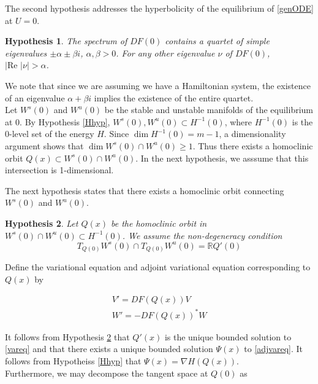 \documentclass[12pt]{article}
\def\R{{\mathbb R}}
\DeclareMathOperator{\dm}{dim}
\newtheorem{hypothesis}{Hypothesis}
\begin{document}
The second hypothesis addresses the hyperbolicity of the equilibrium of \eqref{genODE} at $U = 0$.  

\begin{hypothesis}\label{hypeq}
The spectrum of $DF(0)$ contains a quartet of simple eigenvalues $\pm \alpha \pm \beta i$, $\alpha, \beta > 0$. For any other eigenvalue $\nu$ of $DF(0)$, $|\text{Re }|\nu| > \alpha$.
\end{hypothesis}

We note that since we are assuming we have a Hamiltonian system, the existence of an eigenvalue $\alpha + \beta i$ implies the existence of the entire quartet.\\

Let $W^s(0)$ and $W^u(0)$ be the stable and unstable manifolds of the equilibrium at 0. By Hypothesis \ref{Hhyp}, $W^s(0), W^u(0) \subset H^{-1}(0)$, where $H^{-1}(0)$ is the 0-level set of the energy $H$. Since $\dm H^{-1}(0) = m-1$, a dimensionality argument shows that $\dim W^s(0) \cap W^u(0) \geq 1$. Thus there exists a homoclinic orbit $Q(x) \subset W^s(0) \cap W^u(0)$. In the next hypothesis, we asssume that this intersection is 1-dimensional. 

The next hypothesis states that there exists a homoclinic orbit connecting $W^s(0)$ and $W^u(0)$. 

\begin{hypothesis}\label{transverseQ}
Let $Q(x)$ be the homoclinic orbit in $W^s(0) \cap W^u(0) \subset H^{-1}(0)$. We assume the non-degeneracy condition
\begin{equation}
T_{Q(0)}W^s(0) \cap T_{Q(0)}W^u(0) = \R Q'(0)
\end{equation}
\end{hypothesis}

Define the variational equation and adjoint variational equation corresponding to $Q(x)$ by

\begin{align}
V' = DF(Q(x))V \label{vareq} \\
W' = -DF(Q(x))^* W \label{adjvareq}
\end{align}

It follows from Hypothesis \ref{transverseQ} that $Q'(x)$ is the unique bounded solution to \eqref{vareq} and that there exists a unique bounded solution $\Psi(x)$ to \eqref{adjvareq}. It follows from Hypotheiss \ref{Hhyp} that $\Psi(x) = \nabla H(Q(x))$. \\

Furthermore, we may decompose the tangent space at $Q(0)$ as 
\end{document}
